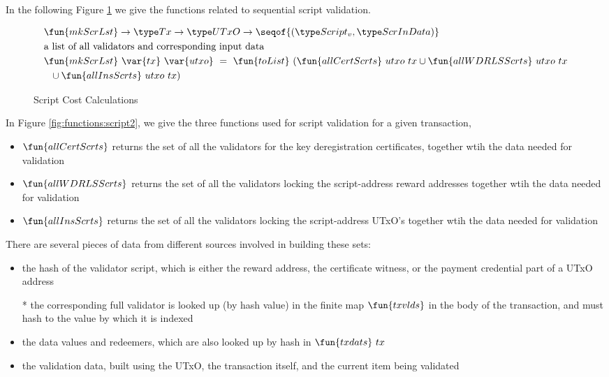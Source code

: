 \clearpage

In the following Figure \ref{fig:functions:script1} we give the functions
related to sequential script validation.

\begin{figure}[htb]
  \begin{align*}
    & \fun{mkScrLst} \to \Tx \to \UTxO \to \seqof{(\ScriptV,\ScrInData)} \\
    & \text{a list of all validators and corresponding input data} \\
    & \fun{mkScrLst} ~\var{tx}~ \var{utxo} ~=~
    \fun{toList}~(\fun{allCertScrts}~{utxo}~{tx} \cup \fun{allWDRLSScrts}~{utxo}~{tx} \\
    & ~~ \cup \fun{allInsScrts}~{utxo}~{tx}) \\
  \end{align*}
  \caption{Script Cost Calculations}
  \label{fig:functions:script1}
\end{figure}

In Figure \ref{fig:functions:script2}, we give the three functions
used for script validation for a given transaction,

\begin{itemize}
\item $\fun{allCertScrts}$ returns the set of all the validators for the
key deregistration certificates, together
wtih the data needed for validation
\item $\fun{allWDRLSScrts}$ returns the set of all the validators locking
the script-address reward addresses together
wtih the data needed for validation
\item $\fun{allInsScrts}$ returns the set of all the validators locking
the script-address UTxO's together
wtih the data needed for validation
\end{itemize}

There are several pieces of data from different sources involved in building these
sets:

\begin{itemize}
\item the hash of the validator script, which is either the reward address,
the certificate witness, or the payment credential part of a UTxO address

* the corresponding
full validator is looked up (by hash value) in the finite map $\fun{txvlds}$ in the
body of the transaction, and must hash to the value by which it is indexed

\item the data values and redeemers, which are also looked up by hash in $\fun{txdats}~{tx}$

\item the validation data, built using the UTxO, the transaction itself,
and the current item being validated
\end{itemize}

